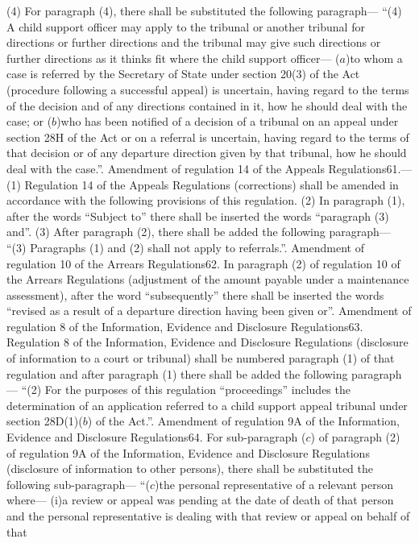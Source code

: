 \documentclass[a4paper]{article}
\begin{document}
(4) For paragraph (4), there shall be substituted the following paragraph—
“(4) A child support officer may apply to the tribunal or another tribunal for
directions or further directions and the tribunal may give such directions or
further directions as it thinks fit where the child support officer—
($a$)to whom a case is referred by the Secretary of State under section 20(3) of
the Act (procedure following a successful appeal) is uncertain, having regard to
the terms of the decision and of any directions contained in it, how he should
deal with the case; or
($b$)who has been notified of a decision of a tribunal on an appeal under section
28H of the Act or on a referral is uncertain, having regard to the terms of that
decision or of any departure direction given by that tribunal, how he should
deal with the case.”.
Amendment of regulation 14 of the Appeals Regulations61.—(1) Regulation 14 of
the Appeals Regulations (corrections) shall be amended in accordance with the
following provisions of this regulation.
(2) In paragraph (1), after the words “Subject to” there shall be inserted the
words “paragraph (3) and”.
(3) After paragraph (2), there shall be added the following paragraph—
“(3) Paragraphs (1) and (2) shall not apply to referrals.”.
Amendment of regulation 10 of the Arrears Regulations62. In paragraph (2) of
regulation 10 of the Arrears Regulations (adjustment of the amount payable under
a maintenance assessment), after the word “subsequently” there shall be inserted
the words “revised as a result of a departure direction having been given or”.
Amendment of regulation 8 of the Information, Evidence and Disclosure
Regulations63. Regulation 8 of the Information, Evidence and Disclosure
Regulations (disclosure of information to a court or tribunal) shall be numbered
paragraph (1) of that regulation and after paragraph (1) there shall be added
the following paragraph—
“(2) For the purposes of this regulation “proceedings” includes the
determination of an application referred to a child support appeal tribunal
under section 28D(1)($b$) of the Act.”.
Amendment of regulation 9A of the Information, Evidence and Disclosure
Regulations64. For sub-paragraph ($c$) of paragraph (2) of regulation 9A of the
Information, Evidence and Disclosure Regulations (disclosure of information to
other persons), there shall be substituted the following sub-paragraph—
“($c$)the personal representative of a relevant person where—
(i)a review or appeal was pending at the date of death of that person and the
personal representative is dealing with that review or appeal on behalf of that
\end{document}
